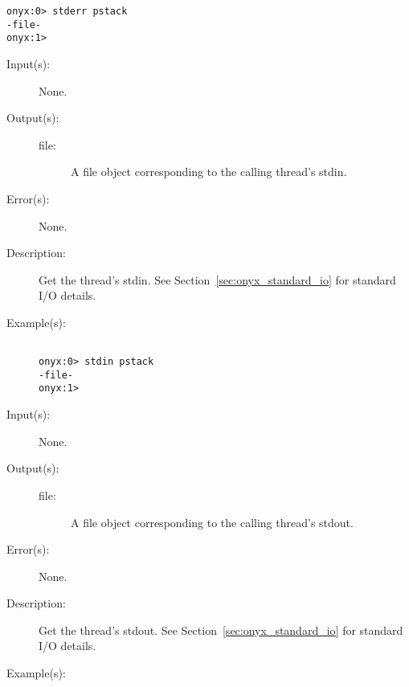 \begin{description}
\begin{description}
\begin{verbatim}
onyx:0> stderr pstack
-file-
onyx:1>
		\end{verbatim}
	\end{description}
\label{systemdict:stdin}
\item[{\onyxop{--}{stdin}{file}}: ]
	\begin{description}\item[]
	\item[Input(s): ] None.
	\item[Output(s): ]
		\begin{description}\item[]
		\item[file: ]
			A file object corresponding to the calling thread's
			stdin.
		\end{description}
	\item[Error(s): ] None.
	\item[Description: ]
		Get the thread's stdin.  See Section~\ref{sec:onyx_standard_io}
		for standard I/O details.
	\item[Example(s): ]\begin{verbatim}

onyx:0> stdin pstack
-file-
onyx:1>
		\end{verbatim}
	\end{description}
\label{systemdict:stdout}
\item[{\onyxop{--}{stdout}{file}}: ]
	\begin{description}\item[]
	\item[Input(s): ] None.
	\item[Output(s): ]
		\begin{description}\item[]
		\item[file: ]
			A file object corresponding to the calling thread's
			stdout.
		\end{description}
	\item[Error(s): ] None.
	\item[Description: ]
		Get the thread's stdout.  See Section~\ref{sec:onyx_standard_io}
		for standard I/O details.
	\item[Example(s): ]\begin{verbatim}


\end{verbatim}
\end{description}
\end{description}
